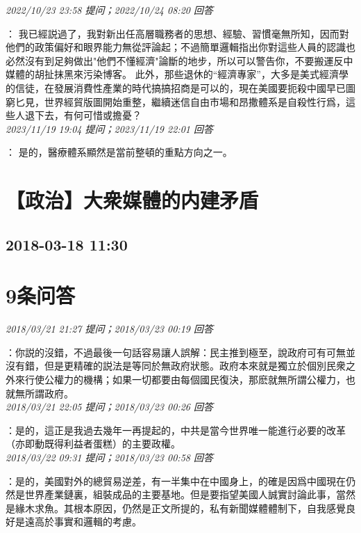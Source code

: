 \documentclass[twocolumn]{ctexart}
\begin{document}
\textit{\hfill\noindent\small 2022/10/23 23:58 提问；2022/10/24 08:20 回答}

：
我已經説過了，我對新出任高層職務者的思想、經驗、習慣毫無所知，因而對他們的政策偏好和眼界能力無從評論起；不過簡單邏輯指出你對這些人員的認識也必然沒有到足夠做出"他們不懂經濟"論斷的地步，所以可以警告你，不要搬運反中媒體的胡扯抹黑來污染博客。
此外，那些退休的“經濟專家”，大多是美式經濟學的信徒，在發展消費性產業的時代搞搞招商是可以的，現在美國要扼殺中國早已圖窮匕見，世界經貿版圖開始重整，繼續迷信自由市場和昂撒體系是自殺性行爲，這些人退下去，有何可惜或擔憂？
\\

\textit{\hfill\noindent\small 2023/11/19 19:04 提问；2023/11/19 22:01 回答}

：
是的，醫療體系顯然是當前整頓的重點方向之一。
\\


\section{【政治】大衆媒體的内建矛盾}
\subsection{2018-03-18 11:30}


\section{9条问答}

\textit{\hfill\noindent\small 2018/03/21 21:27 提问；2018/03/23 00:19 回答}

：你説的沒錯，不過最後一句話容易讓人誤解：民主推到極至，說政府可有可無並沒有錯，但是更精確的説法是等同於無政府狀態。政府本來就是獨立於個別民衆之外來行使公權力的機構；如果一切都要由每個國民復決，那麽就無所謂公權力，也就無所謂政府。
\\

\textit{\hfill\noindent\small 2018/03/21 22:05 提问；2018/03/23 00:26 回答}

：是的，這正是我過去幾年一再提起的，中共是當今世界唯一能進行必要的改革（亦即動既得利益者蛋糕）的主要政權。
\\

\textit{\hfill\noindent\small 2018/03/22 09:31 提问；2018/03/23 00:58 回答}

：是的，美國對外的總貿易逆差，有一半集中在中國身上，的確是因爲中國現在仍然是世界產業鏈裏，組裝成品的主要基地。但是要指望美國人誠實討論此事，當然是緣木求魚。其根本原因，仍然是正文所提的，私有新聞媒體體制下，自我感覺良好是遠高於事實和邏輯的考慮。
\\
\end{document}
